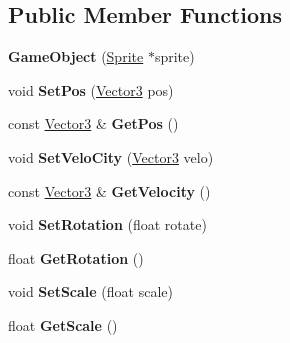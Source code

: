 \subsection*{Public Member Functions}
\begin{DoxyCompactItemize}
\item 
\mbox{\label{class_game_object_a8f340c31ff5aa975ae2ed7439fb5d63f}} 
{\bfseries Game\+Object} (\mbox{\hyperlink{class_sprite}{Sprite}} $\ast$sprite)
\item 
\mbox{\label{class_game_object_a53997902466d2ecb317c4318a3d69816}} 
void {\bfseries Set\+Pos} (\mbox{\hyperlink{class_vector3}{Vector3}} pos)
\item 
\mbox{\label{class_game_object_ab66324d123ba785d66a11b386a5c0893}} 
const \mbox{\hyperlink{class_vector3}{Vector3}} \& {\bfseries Get\+Pos} ()
\item 
\mbox{\label{class_game_object_a82d69d7c9ee269b19cc3528b64281355}} 
void {\bfseries Set\+Velo\+City} (\mbox{\hyperlink{class_vector3}{Vector3}} velo)
\item 
\mbox{\label{class_game_object_a1c0f6935d6ffba2fb08c14f1ee09a6d1}} 
const \mbox{\hyperlink{class_vector3}{Vector3}} \& {\bfseries Get\+Velocity} ()
\item 
\mbox{\label{class_game_object_a58a597b9cd7c9a9e37df1c9d428aa67e}} 
void {\bfseries Set\+Rotation} (float rotate)
\item 
\mbox{\label{class_game_object_afe8fb5f6303da023e500b1d4b1953b7b}} 
float {\bfseries Get\+Rotation} ()
\item 
\mbox{\label{class_game_object_a4ae7e9b3601eb05064f894744aac6074}} 
void {\bfseries Set\+Scale} (float scale)
\item 
\mbox{\label{class_game_object_a513e27cf7361d3c0a9cac3c994cd9017}} 
float {\bfseries Get\+Scale} ()
\item 
\mbox{\label{class_game_object_a56f7b1343ae2edad88a1ba9662e76947}} 

\end{DoxyCompactItemize}
